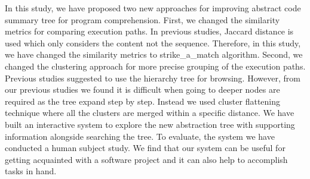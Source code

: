 In this study, we have proposed two new approaches for improving abstract code summary tree for program comprehension. First, we changed the similarity metrics for comparing execution paths. In previous studies, Jaccard distance is used which only considers the content not the sequence. Therefore, in this study, we have changed the similarity metrics to strike\_a\_match algorithm. Second, we changed the clustering approach for more precise grouping of the execution paths. Previous studies suggested to use the hierarchy tree for browsing. However, from our previous studies we found it is difficult when going to deeper nodes are required as the tree expand step by step. Instead we used cluster flattening technique where all the clusters are merged within a specific distance. We have built an interactive system to explore the new abstraction tree with supporting information alongside searching the tree. To evaluate, the system we have conducted a human subject study. We find that our system can be useful for getting acquainted with a software project and it can also help to accomplish tasks in hand.  

